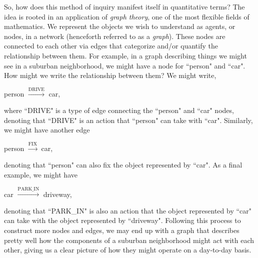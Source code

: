 \documentclass[12pt]{article}
\theoremstyle{definition}
\begin{document}
So, how does this method of inquiry manifest itself in quantitative terms? The idea is rooted in an application of \textit{graph theory}, one of the most flexible fields of mathematics. We represent the objects we wish to understand as agents, or nodes, in a network (henceforth referred to as a \textit{graph}). These nodes are connected to each other via edges that categorize and/or quantify the relationship between them. For example, in a graph describing things we might see in a suburban neighborhood, we might have a node for ``person" and ``car". How might we write the relationship between them? We might write,

\begin{center}
    person $\xrightarrow{\text{DRIVE}}$ car,
\end{center}

where ``DRIVE" is a type of edge connecting the ``person" and ``car" nodes, denoting that ``DRIVE" is an action that ``person" can take with ``car". Similarly, we might have another edge

\begin{center}
    person $\xrightarrow{\text{FIX}}$ car,
\end{center}

denoting that ``person" can also fix the object represented by ``car". As a final example, we might have

\begin{center}
    car $\xrightarrow{\text{PARK\_IN}}$ driveway,
\end{center}

denoting that ``PARK\_IN" is also an action that the object represented by ``car" can take with the object represented by ``driveway". Following this process to construct more nodes and edges, we may end up with a graph that describes pretty well how the components of a suburban neighborhood might act with each other, giving us a clear picture of how they might operate on a day-to-day basis.
\end{document}
